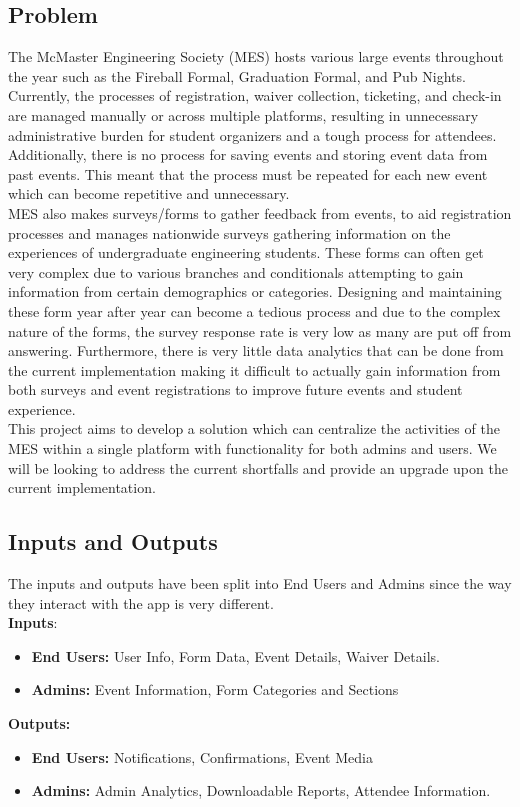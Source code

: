 \documentclass{article}
\begin{document}
\subsection{Problem}
\hspace*{2em} The McMaster Engineering Society (MES) hosts various large events throughout the year such as the Fireball Formal, Graduation Formal, and Pub Nights. Currently, the processes of registration, waiver collection, ticketing, and check-in are managed manually or across multiple platforms, resulting in unnecessary administrative burden for student organizers and a tough process for attendees. Additionally, there is no process for saving events and storing event data from past events. This meant that the process must be repeated for each new event which can become repetitive and unnecessary.\\
\newline
\hspace*{2em} MES also makes surveys/forms to gather feedback from events, to aid registration processes and manages nationwide surveys gathering information on the experiences of undergraduate engineering students. These forms can often get very complex due to various branches and conditionals attempting to gain information from certain demographics or categories. Designing and maintaining these form year after year can become a tedious process and due to the complex nature of the forms, the survey response rate is very low as many are put off from answering. Furthermore, there is very little data analytics that can be done from the current implementation making it difficult to actually gain information from both surveys and event registrations to improve future events and student experience. \\
\newline
\hspace*{2em} This project aims to develop a solution which can centralize the activities of the MES within a single platform with functionality for both admins and users. We will be looking to address the current shortfalls and provide an upgrade upon the current implementation.
\subsection{Inputs and Outputs}
The inputs and outputs have been split into End Users and Admins since the way they interact with the app is very different.\\
\textbf{Inputs}:
\begin{itemize}
    \item \textbf{End Users:}
        User Info, Form Data, Event Details, Waiver Details.
    \item \textbf{Admins:} Event Information, Form Categories and Sections
\end{itemize}
\textbf{Outputs:}
\begin{itemize}
    \item \textbf{End Users:} Notifications, Confirmations, Event Media
    \item \textbf{Admins:} Admin Analytics, Downloadable Reports, Attendee Information.
\end{itemize}
\end{document}

